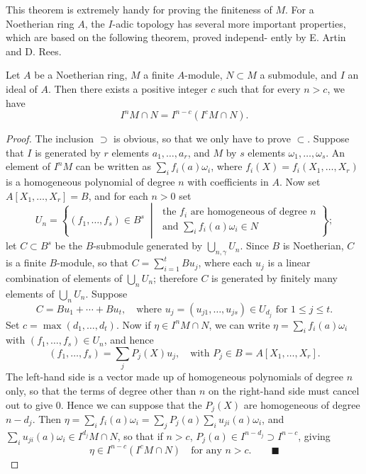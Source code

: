 This theorem is extremely handy for proving the finiteness of $M$. For a
Noetherian ring $A$, the $I$-adic topology has several more important
properties, which are based on the following theorem, proved independ-
ently by E. Artin and D. Rees.

\begin{theorem}\label{thm:8.5}
Let $A$ be a Noetherian ring, $M$ a
finite $A$-module, $N \subset M$ a submodule, and $I$ an ideal of $A$. Then there exists
a positive integer $c$ such that for every $n > c$, we have
\[
  I^nM \cap N = I^{n-c}(I^cM \cap N).
\]
\end{theorem}

\begin{proof}
The inclusion $\supset$ is obvious, so that we only have to prove $\subset$.
Suppose that $I$ is generated by $r$ elements $a_1, \ldots, a_r$, and $M$ by $s$ elements
$\omega_1, \ldots, \omega_s$. An element of $I^nM$ can be written as $\sum_i f_i(a)\omega_i$, where
$f_i(X) = f_i(X_1, \ldots, X_r)$ is a homogeneous polynomial of degree $n$ with
coefficients in $A$. Now set $A[X_1, \ldots, X_r] = B$, and for each $n > 0$ set
\[
  U_n = \left\{(f_1, \ldots, f_s) \in B^s \;\middle|\;
    \begin{array}{l}
      \text{the } f_i \text{ are homogeneous of degree } n \\
      \text{and } \sum_i f_i(a)\omega_i \in N
    \end{array} \right\};
\]
let $C \subset B^s$ be the $B$-submodule generated by $\bigcup_{n, \gamma} U_n$. Since $B$ is Noetherian,
$C$ is a finite $B$-module, so that $C = \sum_{i=1}^{t} Bu_j$, where each $u_j$ is a linear
combination of elements of $\bigcup_n U_n$; therefore $C$ is generated by finitely
many elements of $\bigcup_n U_n$. Suppose
\[
  C = Bu_1 + \cdots + Bu_t, \quad \text{where } u_j = (u_{j1}, \ldots, u_{js}) \in U_{d_j} \text{ for } 1 \le j \le t.
\]
Set $c = \max(d_1, \ldots, d_t)$. Now if $\eta \in I^nM \cap N$, we can write $\eta = \sum_i f_i(a)\omega_i$ with
$(f_1, \ldots, f_s) \in U_n$, and hence
\[
  (f_1, \ldots, f_s) = \sum_j P_j(X)u_j, \quad \text{with } P_j \in B = A[X_1, \ldots, X_r].
\]
The left-hand side is a vector made up of homogeneous polynomials of
degree $n$ only, so that the terms of degree other than $n$ on the right-hand side
must cancel out to give $0$. Hence we can suppose that the $P_j(X)$ are
homogeneous of degree $n - d_j$. Then $\eta = \sum_i f_i(a)\omega_i = \sum_j P_j(a) \sum_i u_{ji}(a)\omega_i$,
and $\sum_i u_{ji}(a)\omega_i \in I^{d_j}M \cap N$, so that if $n > c$, $P_j(a) \in I^{n-d_j} \supset I^{n-c}$, giving
\[
  \eta \in I^{n-c}(I^cM \cap N) \quad \text{for any } n > c. \qquad\blacksquare
\]
\end{proof}


